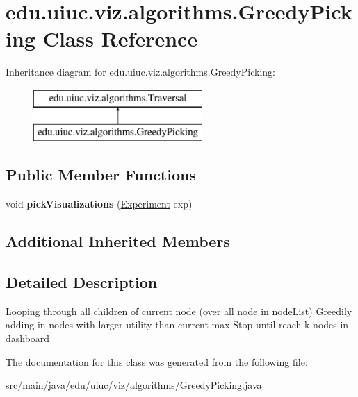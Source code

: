 \hypertarget{classedu_1_1uiuc_1_1viz_1_1algorithms_1_1_greedy_picking}{}\section{edu.\+uiuc.\+viz.\+algorithms.\+Greedy\+Picking Class Reference}
\label{classedu_1_1uiuc_1_1viz_1_1algorithms_1_1_greedy_picking}
Inheritance diagram for edu.\+uiuc.\+viz.\+algorithms.\+Greedy\+Picking\+:\begin{figure}[H]
\begin{center}
\leavevmode
\includegraphics[height=2.000000cm]{classedu_1_1uiuc_1_1viz_1_1algorithms_1_1_greedy_picking}
\end{center}
\end{figure}
\subsection*{Public Member Functions}
\begin{DoxyCompactItemize}
\item 
\mbox{\label{classedu_1_1uiuc_1_1viz_1_1algorithms_1_1_greedy_picking_ad5d8f2091f29c64aebf34b86b9f5f5c9}} 
void {\bfseries pick\+Visualizations} (\mbox{\hyperlink{classedu_1_1uiuc_1_1viz_1_1algorithms_1_1_experiment}{Experiment}} exp)
\end{DoxyCompactItemize}
\subsection*{Additional Inherited Members}


\subsection{Detailed Description}
Looping through all children of current node (over all node in node\+List) Greedily adding in nodes with larger utility than current max Stop until reach k nodes in dashboard 

The documentation for this class was generated from the following file\+:\begin{DoxyCompactItemize}
\item 
src/main/java/edu/uiuc/viz/algorithms/Greedy\+Picking.\+java\end{DoxyCompactItemize}
